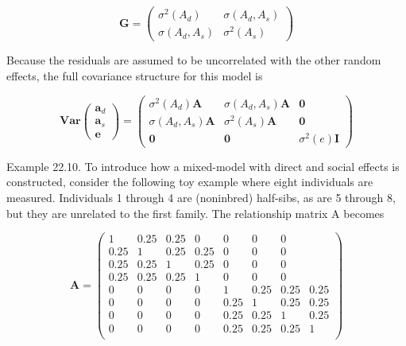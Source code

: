 \documentclass{article}
\begin{document}
\begin{equation}
\mathbf{G}=\begin{pmatrix}\sigma^{2}(A_{d})&\sigma(A_{d},A_{s})\\\sigma(A_{d},A_{s})&\sigma^{2}(A_{s})\end{pmatrix}
\tag{22.39b}
\label{eq:22_39b}
\end{equation}

Because the residuals are assumed to be uncorrelated with the other random effects, the full covariance structure for this model is

\begin{equation}
\mathbf{V a r}\begin{pmatrix}\mathbf{a}_{d}\\ \mathbf{a}_{s}\\ \mathbf{e}\end{pmatrix}=\begin{pmatrix}\sigma^{2}(A_{d})\mathbf{A}&\sigma(A_{d},A_{s})\mathbf{A}&\mathbf{0}\\ \sigma(A_{d},A_{s})\mathbf{A}&\sigma^{2}(A_{s})\mathbf{A}&\mathbf{0}\\ \mathbf{0}&\mathbf{0}&\sigma^{2}(e)\mathbf{I}\end{pmatrix}
\tag{22.39c}
\label{eq:22_39c}
\end{equation}

Example 22.10. To introduce how a mixed-model with direct and social effects is constructed, consider the following toy example where eight individuals are measured. Individuals 1 through 4 are (noninbred) half-sibs, as are 5 through 8, but they are unrelated to the first family. The relationship matrix A becomes

\begin{equation}
\mathbf{A}=\begin{pmatrix}{{{1}}}&{{{0.25}}}&{{{0.25}}}&{{{0}}}&{{{0}}}&{{{0}}}&{{{0}}} \\{{{0.25}}}&{{{1}}}&{{{0.25}}}&{{{0.25}}}&{{{0}}}&{{{0}}}&{{{0}}} \\{{{0.25}}}&{{{0.25}}}&{{{1}}}&{{{0.25}}}&{{{0}}}&{{{0}}}&{{{0}}} \\{{{0.25}}}&{{{0.25}}}&{{{0.25}}}&{{{1}}}&{{{0}}}&{{{0}}}&{{{0}}} \\{{{0}}}&{{{0}}}&{{{0}}}&{{{0}}}&{{{1}}}&{{{0.25}}}&{{{0.25}}}&{{{0.25}}} \\{{{0}}}&{{{0}}}&{{{0}}}&{{{0}}}&{{{0.25}}}&{{{1}}}&{{{0.25}}}&{{{0.25}}} \\{{{0}}}&{{{0}}}&{{{0}}}&{{{0}}}&{{{0.25}}}&{{{0.25}}}&{{{1}}}&{{{0.25}}} \\{{{0}}}&{{{0}}}&{{{0}}}&{{{0}}}&{{{0.25}}}&{{{0.25}}}&{{{0.25}}}&{{{1}}} \\\end{pmatrix}
\end{equation}
\end{document}
